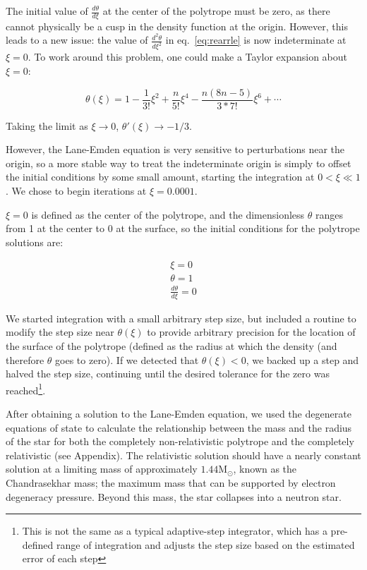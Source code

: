 \documentclass[twoside]{article}
\begin{document}
\begin{multicols}{2}
The initial value of \(\frac{d\theta}{d\xi}\) at the center of the polytrope
must be zero, as there cannot physically be a cusp in the density function at
the origin. However, this leads to a new issue: the value of
\(\frac{d^2\theta}{d\xi^2}\) in eq.~\ref{eq:rearrle} is now indeterminate at
\(\xi=0\). To work around this problem, one could make a Taylor expansion about
\(\xi=0\)\cite[p.339]{hansen2004}:

\begin{equation}
    \theta(\xi)=1-\frac{1}{3!}\xi^2+\frac{n}{5!}\xi^4-\frac{n(8n-5)}{3*7!}\xi^6+\dotsb
\end{equation}

Taking the limit as \(\xi\rightarrow 0\), \(\theta'(\xi)\rightarrow -1/3\).

However, the Lane-Emden equation is very sensitive to perturbations near the
origin\cite[p.340]{hansen2004}, so a more stable way to treat the indeterminate
origin is simply to offset the initial conditions by some small amount, starting
the integration at \(0 < \xi \ll 1\). We chose to begin iterations at
\(\xi=0.0001\).

\(\xi=0\) is defined as the center of the polytrope, and the dimensionless
\(\theta\) ranges from 1 at the center to 0 at the surface, so the initial
conditions for the polytrope solutions are:

\[
    \begin{array}{l}
        \xi = 0 \\
        \theta = 1 \\
        \frac{d\theta}{d\xi} = 0
    \end{array}
\]

We started integration with a small arbitrary step size, but included a routine
to modify the step size near \(\theta(\xi)\) to provide arbitrary precision for
the location of the surface of the polytrope (defined as the radius at which the
density (and therefore \(\theta\) goes to zero). If we detected that
\(\theta(\xi) < 0\), we backed up a step and halved the step size, continuing
until the desired tolerance for the zero was reached\footnote{This is not the
same as a typical adaptive-step integrator, which has a pre-defined range of
integration and adjusts the step size based on the estimated error of each
step}.

After obtaining a solution to the Lane-Emden equation, we used the degenerate
equations of state to calculate the relationship between the mass and the
radius of the star for both the completely non-relativistic polytrope and the
completely relativistic (see Appendix). The relativistic solution should have a
nearly constant solution at a limiting mass of approximately
\(1.44\mathrm{M}_{\odot}\), known as the Chandrasekhar mass\cite{chandra1939}; the maximum mass
that can be supported by electron degeneracy pressure. Beyond this mass, the
star collapses into a neutron star.


\end{multicols}
\end{document}
